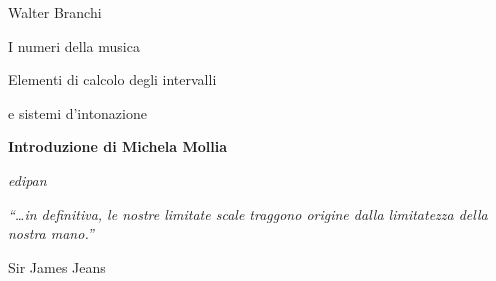 \documentclass[11pt,twoside,openany]{book}
\newcommand{\Autore}{Walter Branchi}
\newcommand{\Titolo}{I numeri della musica}
\newcommand{\SottotitoloA}{Elementi di calcolo degli intervalli}
\newcommand{\SottotitoloB}{e sistemi d'intonazione}
\newcommand{\Introduttore}{Michela Mollia}
\newcommand{\Editore}{edipan}
\begin{document}
\frontmatter
\thispagestyle{empty}
\begin{center}
  \vspace*{1.2cm}
  {\Large \Autore\par}
  \vspace{2.4cm}
  {\fontsize{30}{34}\selectfont \Titolo\par}
  \vspace{0.45cm}
  {\LARGE \SottotitoloA\par}
  \vspace{0.18cm}
  {\LARGE \SottotitoloB\par}
  \vspace{2.6cm}
  {\large\bfseries Introduzione di \Introduttore\par}
  \vfill
  {\large\itshape \Editore\par}
  \vspace{1.2cm}
\end{center}
\clearpage

\tableofcontents
\cleardoublepage

\mainmatter

\thispagestyle{empty}
\null\vfill
\begin{flushright}
\begin{minipage}{0.7\textwidth}
\itshape
\enquote{\dots in definitiva, le nostre limitate scale traggono origine dalla
limitatezza della nostra mano.}
\par\medskip
\upshape\raggedleft Sir James Jeans
\end{minipage}
\end{flushright}
\vfill
\cleardoublepage






\end{document}

